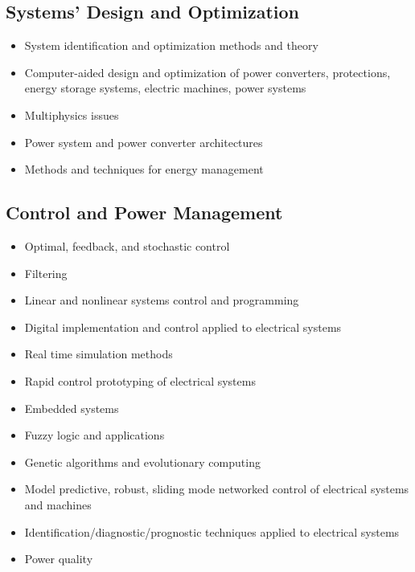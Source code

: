 \documentclass[smallextended,twocolumn]{electrimacs2024}
\begin{document}
 \subsection{Systems’ Design and Optimization}
\begin{itemize}
\item System identification and optimization methods and theory
\item Computer-aided design and optimization of power converters, protections, energy storage systems, electric machines, power systems
\item Multiphysics issues
\item Power system and power converter architectures
\item Methods and techniques for energy management  
\end{itemize}

 \subsection{Control and Power Management}
\begin{itemize}
\item Optimal, feedback, and stochastic control
\item Filtering
\item Linear and nonlinear systems control and programming
\item Digital implementation and control applied to electrical systems
\item Real time simulation methods
\item Rapid control prototyping of electrical systems
\item Embedded systems
\item Fuzzy logic and applications
\item Genetic algorithms and evolutionary computing
\item Model predictive, robust, sliding mode networked control of electrical systems and machines
\item Identification/diagnostic/prognostic techniques applied to electrical systems
\item Power quality
\end{itemize}
\end{document}
